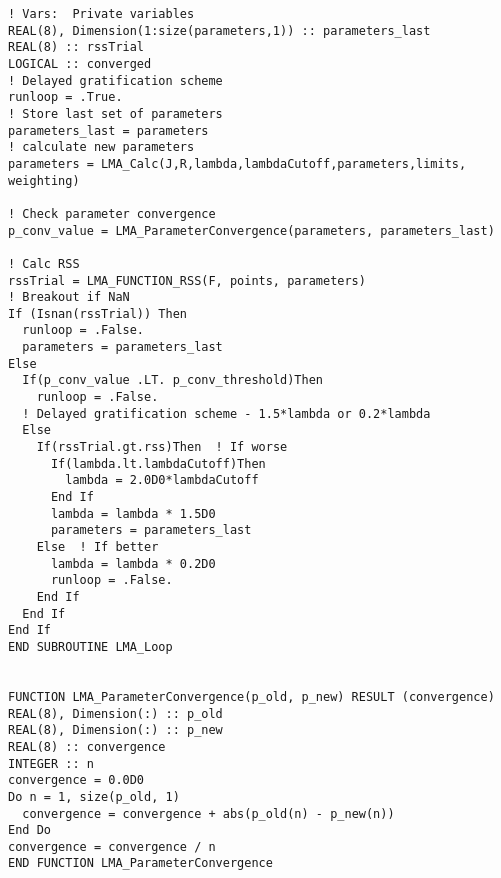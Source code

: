 \begin{lstlisting}[style=sFortran,caption={Add two numbers function}]
! Vars:  Private variables
REAL(8), Dimension(1:size(parameters,1)) :: parameters_last
REAL(8) :: rssTrial
LOGICAL :: converged
! Delayed gratification scheme
runloop = .True.
! Store last set of parameters
parameters_last = parameters
! calculate new parameters
parameters = LMA_Calc(J,R,lambda,lambdaCutoff,parameters,limits, weighting)

! Check parameter convergence
p_conv_value = LMA_ParameterConvergence(parameters, parameters_last)

! Calc RSS
rssTrial = LMA_FUNCTION_RSS(F, points, parameters)
! Breakout if NaN
If (Isnan(rssTrial)) Then
  runloop = .False.
  parameters = parameters_last
Else
  If(p_conv_value .LT. p_conv_threshold)Then
    runloop = .False.
  ! Delayed gratification scheme - 1.5*lambda or 0.2*lambda
  Else
    If(rssTrial.gt.rss)Then  ! If worse
      If(lambda.lt.lambdaCutoff)Then
        lambda = 2.0D0*lambdaCutoff
      End If
      lambda = lambda * 1.5D0
      parameters = parameters_last
    Else  ! If better
      lambda = lambda * 0.2D0
      runloop = .False.
    End If
  End If
End If
END SUBROUTINE LMA_Loop


FUNCTION LMA_ParameterConvergence(p_old, p_new) RESULT (convergence)
REAL(8), Dimension(:) :: p_old
REAL(8), Dimension(:) :: p_new
REAL(8) :: convergence
INTEGER :: n
convergence = 0.0D0
Do n = 1, size(p_old, 1)
  convergence = convergence + abs(p_old(n) - p_new(n))
End Do
convergence = convergence / n
END FUNCTION LMA_ParameterConvergence


\end{lstlisting}
